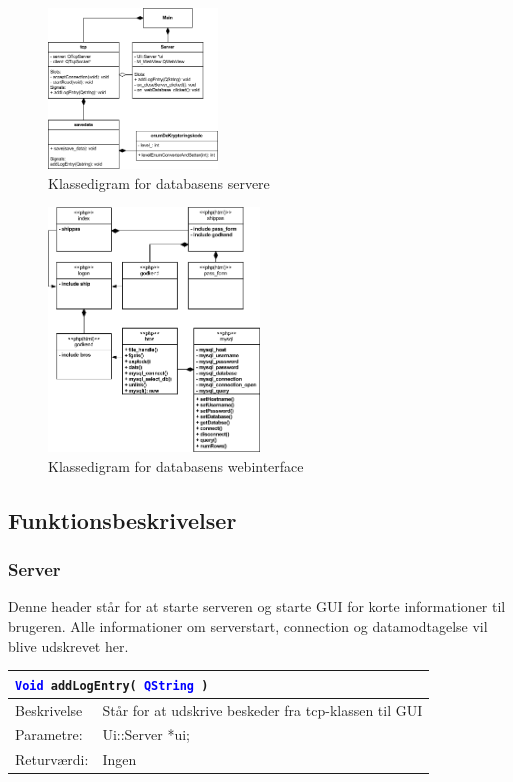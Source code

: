 \begin{figure}[htbp]
	\centering
	\includegraphics[width=0.4\textwidth]{billeder/Database/serverKlassediagram}
	\caption{Klassedigram for databasens servere}
	\label{fig:serverKlassediagram}
\end{figure}

\begin{figure}[H]
	\centering
	\includegraphics[width=0.5\textwidth]{billeder/Database/web_klasse}
	\caption{Klassedigram for databasens webinterface}
	\label{fig:serverKlassediagram}
\end{figure}


\subsection{Funktionsbeskrivelser}
\subsubsection{Server}
Denne header står for at starte serveren og starte GUI for korte informationer til brugeren. Alle informationer om serverstart, connection og datamodtagelse vil blive udskrevet her. 

\begin{table}[H]
\begin{tabular}{l p{12.5cm}}
\multicolumn{2}{l}{\texttt{\textcolor{blue}{Void} addLogEntry( \textcolor{blue}{QString} )}} \\
\hline
Beskrivelse & Står for at udskrive beskeder fra tcp-klassen til GUI \\
Parametre: & Ui::Server *ui;\\
Returværdi:& Ingen\\
\end{tabular}
\end{table}

